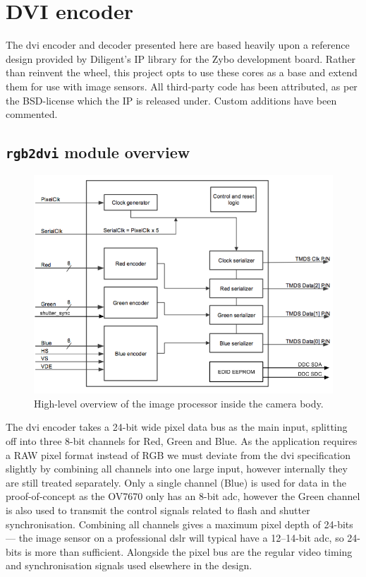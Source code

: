 \section{DVI encoder}


The \gls{dvi} encoder and decoder presented here are based heavily upon a reference design provided by Diligent's IP library for the Zybo development board. Rather than reinvent the wheel, this project opts to use these cores as a base and extend them for use with image sensors. All third-party code has been attributed, as per the BSD-license which the IP is released under. Custom additions have been commented.

\subsection{\texttt{rgb2dvi} module overview}

\begin{figure}
  \centering
  \includegraphics[width=1\textwidth]{./img/rgb2dvi.png}
  \caption{High-level overview of the image processor inside the camera body.}
  \label{fig:image_processor_diagram}
\end{figure}

The \gls{dvi} encoder takes a 24-bit wide pixel data bus as the main input, splitting off into three 8-bit channels for Red, Green and Blue. As the application requires a RAW pixel format instead of RGB we must deviate from the \gls{dvi} specification slightly by combining all channels into one large input, however internally they are still treated separately. Only a single channel (Blue) is used for data in the proof-of-concept as the OV7670 only has an 8-bit \gls{adc}, however the Green channel is also used to transmit the control signals related to flash and shutter synchronisation. Combining all channels gives a maximum pixel depth of 24-bits --- the image sensor on a professional \gls{dslr} will typical have a 12--14-bit \gls{adc}, so 24-bits is more than sufficient. Alongside the pixel bus are the regular video timing and synchronisation signals used elsewhere in the design. 

